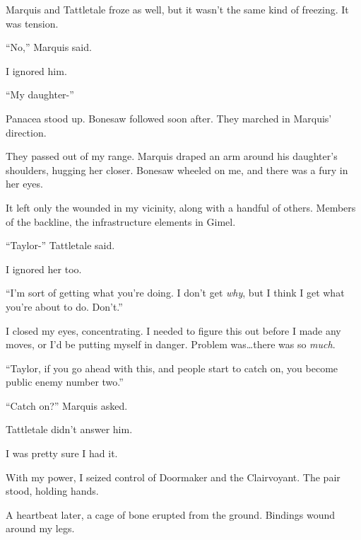 Marquis and Tattletale froze as well, but it wasn't the same kind of freezing.  It was tension.



``No,'' Marquis said.



I ignored him.



``My daughter-''



Panacea stood up.  Bonesaw followed soon after.  They marched in Marquis' direction.



They passed out of my range.  Marquis draped an arm around his daughter's shoulders, hugging her closer.  Bonesaw wheeled on me, and there was a fury in her eyes.



It left only the wounded in my vicinity, along with a handful of others.  Members of the backline, the infrastructure elements in Gimel.



``Taylor-'' Tattletale said.



I ignored her too.



``I'm sort of getting what you're doing.  I don't get \emph{why}, but I think I get what you're about to do.  Don't.''



I closed my eyes, concentrating.  I needed to figure this out before I made any moves, or I'd be putting myself in danger.  Problem was\ldots there was so \emph{much}.



``Taylor, if you go ahead with this, and people start to catch on, you become public enemy number two.''



``Catch on?'' Marquis asked.



Tattletale didn't answer him.



I was pretty sure I had it.



With my power, I seized control of Doormaker and the Clairvoyant.  The pair stood, holding hands.



A heartbeat later, a cage of bone erupted from the ground.  Bindings wound around my legs.



